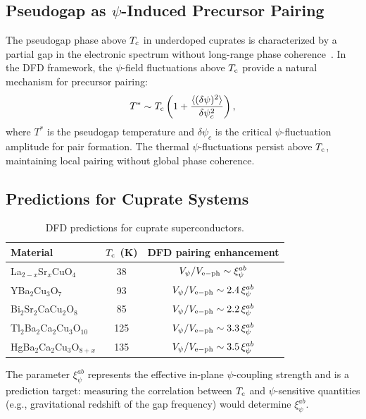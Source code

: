 \documentclass[aps,prb,twocolumn,superscriptaddress,floatfix,nofootinbib,longbibliography]{revtex4-2}
\newcommand{\Tc}{T_{\rm c}}
\newcommand{\avg}[1]{\langle #1 \rangle}
\begin{document}
\subsection{Pseudogap as $\psi$-Induced Precursor Pairing}

The pseudogap phase above $\Tc$ in underdoped cuprates is characterized
by a partial gap in the electronic spectrum without long-range phase
coherence~\cite{Timusk1999}.  In the DFD framework, the $\psi$-field
fluctuations above $\Tc$ provide a natural mechanism for precursor
pairing:
\begin{equation}
T^* \sim \Tc\left(1 + \frac{\avg{(\delta\psi)^2}}{\delta\psi_c^2}\right),
\label{eq:pseudogap}
\end{equation}
where $T^*$ is the pseudogap temperature and $\delta\psi_c$ is the
critical $\psi$-fluctuation amplitude for pair formation.  The thermal
$\psi$-fluctuations persist above $\Tc$, maintaining local pairing
without global phase coherence.

\subsection{Predictions for Cuprate Systems}

\begin{table}[h]
\caption{DFD predictions for cuprate superconductors.}
\label{tab:cuprate-pred}
\begin{ruledtabular}
\begin{tabular}{lcc}
Material & $\Tc$ (K) & DFD pairing enhancement \\
\hline
La$_{2-x}$Sr$_x$CuO$_4$ & 38 & $V_\psi/V_{\rm e-ph} \sim \xi_\psi^{ab}$ \\
YBa$_2$Cu$_3$O$_7$ & 93 & $V_\psi/V_{\rm e-ph} \sim 2.4\,\xi_\psi^{ab}$ \\
Bi$_2$Sr$_2$CaCu$_2$O$_8$ & 85 & $V_\psi/V_{\rm e-ph} \sim 2.2\,\xi_\psi^{ab}$ \\
Tl$_2$Ba$_2$Ca$_2$Cu$_3$O$_{10}$ & 125 & $V_\psi/V_{\rm e-ph} \sim 3.3\,\xi_\psi^{ab}$ \\
HgBa$_2$Ca$_2$Cu$_3$O$_{8+x}$ & 135 & $V_\psi/V_{\rm e-ph} \sim 3.5\,\xi_\psi^{ab}$ \\
\end{tabular}
\end{ruledtabular}
\end{table}

The parameter $\xi_\psi^{ab}$ represents the effective in-plane
$\psi$-coupling strength and is a prediction target: measuring the
correlation between $\Tc$ and $\psi$-sensitive quantities (e.g.,
gravitational redshift of the gap frequency) would determine
$\xi_\psi^{ab}$.
\end{document}

